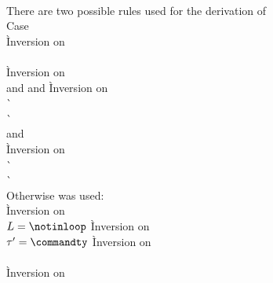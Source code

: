 \begin{description}
\begin{tabbing}
  \\
  There are two possible rules used for the derivation of
     \\
  Case  \+ \\
      \` Inversion on  \\
     \\
      \` Inversion on  \\
     and  and 
      \` Inversion on  \\
      \`  \\
      \`  \\
     and  \\
      \` Inversion on  \\
      \`  \\
      \`  \- \\
  Otherwise  was used: \+ \\
      \` Inversion on  \\
    $L = \notinloop$
      \` Inversion on  \\
    $\tau' = \commandty$
      \` Inversion on  \\
     \\
      \` Inversion on  \\

\end{tabbing}
\end{description}
